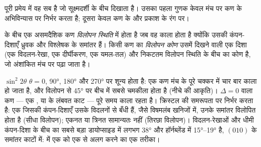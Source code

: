 पूरी प्रमेय में वह सब है जो सूक्ष्मदर्शी  के बीच दिखाता है। उसका पहला गुणक केवल मंच पर कण के अभिविन्यास
पर निर्भर करता है; दूसरा केवल कण के  और प्रकाश के रंग पर।
\begin{definition}[विलोपन स्थिति, विलोपन कोण]\label{def:b1:optical-mineralogy:extinction}
 के बीच एक असमदैशिक कण \emph{विलोपन स्थिति} में होता है जब वह काला होता है क्योंकि
उसकी कंपन-दिशाएँ ध्रुवक और विश्लेषक के समांतर हैं। किसी कण का \emph{विलोपन कोण} उसमें दिखने वाली एक
दिशा (एक विदलन-रेखा, एक दीर्घीकरण, एक यमल-तल) और निकटतम विलोपन स्थिति के बीच का कोण है, जो अंशांकित मंच पर पढ़ा जाता है।
\end{definition}

$\sin^2 2\theta$ $\theta = 0$, \ang{90}, \ang{180} और \ang{270} पर शून्य होता है: एक कण मंच के पूरे चक्कर में चार बार काला हो
जाता है, और विलोपन से \ang{45} पर बीच में सबसे चमकीला होता है (नीचे की आकृति)। $\Delta = 0$ वाला कण --- एक , या  के लंबवत काट --- पूरे समय काला रहता है।  क्रिस्टल की समरूपता पर निर्भर करता है: एक
 जिसकी कंपन-दिशाएँ उसके विदलनों से बँधी हैं, जैसे विषमलंब खनिजों में, उनके समांतर विलोपित होता है (सीधा
विलोपन); एकनत या त्रिनत  सामान्यतः नहीं (तिरछा विलोपन)। विदलन-रेखाओं और धीमी कंपन-दिशा के बीच का सबसे बड़ा  डायोप्साइड में लगभग \ang{38} और हॉर्नब्लेंड में \ang{15}--\ang{19} है, $(010)$ के समांतर काटों में:  में एक
 को एक  से अलग करने का एक तरीका।

